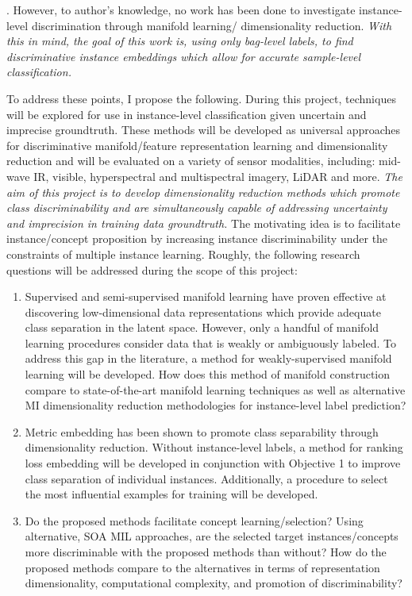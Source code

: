 \cite{Xu2011MI_Metric_Learning}.  However, to author's knowledge, no work has been done to investigate instance-level discrimination through manifold learning/ dimensionality reduction.  \textit{With this in mind, the goal of this work is, using only bag-level labels, to find discriminative instance embeddings which allow for accurate sample-level classification.}

To address these points, I propose the following.  During this project, techniques will be explored for use in instance-level classification given uncertain and imprecise groundtruth.  These methods will be developed as universal approaches for discriminative manifold/feature representation learning and dimensionality reduction and will be evaluated on a variety of sensor modalities, including: mid-wave IR, visible, hyperspectral and multispectral imagery, LiDAR and more.  \textit{The aim of this project is to develop dimensionality reduction methods which promote class discriminability and are simultaneously capable of addressing uncertainty and imprecision in training data groundtruth.}  The motivating idea is to facilitate instance/concept proposition by increasing instance discriminability under the constraints of multiple instance learning. Roughly, the following research questions will be addressed during the scope of this project:
\begin{enumerate}
	\item Supervised and semi-supervised manifold learning have proven effective at discovering low-dimensional data representations which provide adequate class separation in the latent space.  However, only a handful of manifold learning procedures consider data that is weakly or ambiguously labeled.  To address this gap in the literature, a method for weakly-supervised manifold learning will be developed. How does this method of manifold construction compare to state-of-the-art manifold learning techniques as well as alternative MI dimensionality reduction methodologies for instance-level label prediction?
	\item Metric embedding has been shown to promote class separability through dimensionality reduction.  Without instance-level labels, a method for ranking loss embedding will be developed in conjunction with Objective 1 to improve class separation of individual instances.  Additionally, a procedure to select the most influential examples for training will be developed.
	\item Do the proposed methods facilitate concept learning/selection?  Using alternative, SOA MIL approaches, are the selected target instances/concepts more discriminable with the proposed methods than without?  How do the proposed methods compare to the alternatives in terms of representation dimensionality, computational complexity, and promotion of discriminability?
\end{enumerate} 

